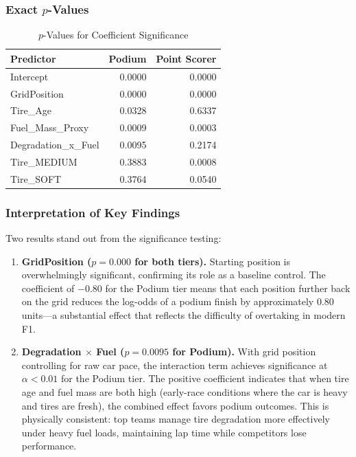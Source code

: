 \subsubsection{Exact $p$-Values}

\begin{table}[htbp]
  \centering
  \caption{$p$-Values for Coefficient Significance}
  \label{tab:pvalues}
  \small
  \begin{tabular}{lrr}
    \toprule
    \textbf{Predictor} & \textbf{Podium} & \textbf{Point Scorer} \\
    \midrule
    Intercept           & 0.0000 & 0.0000 \\
    GridPosition        & 0.0000 & 0.0000 \\
    Tire\_Age           & 0.0328 & 0.6337 \\
    Fuel\_Mass\_Proxy   & 0.0009 & 0.0003 \\
    Degradation\_x\_Fuel & 0.0095 & 0.2174 \\
    Tire\_MEDIUM        & 0.3883 & 0.0008 \\
    Tire\_SOFT          & 0.3764 & 0.0540 \\
    \bottomrule
  \end{tabular}
\end{table}

\subsubsection{Interpretation of Key Findings}

Two results stand out from the significance testing:

\begin{enumerate}
  \item \textbf{GridPosition ($p = 0.000$ for both tiers).} Starting position
    is overwhelmingly significant, confirming its role as a baseline control.
    The coefficient of $-0.80$ for the Podium tier means that each position
    further back on the grid reduces the log-odds of a podium finish by
    approximately 0.80 units---a substantial effect that reflects the
    difficulty of overtaking in modern F1.

  \item \textbf{Degradation $\times$ Fuel ($p = 0.0095$ for Podium).} With
    grid position controlling for raw car pace, the interaction term achieves
    significance at $\alpha < 0.01$ for the Podium tier. The positive
    coefficient indicates that when tire age and fuel mass are both high
    (early-race conditions where the car is heavy and tires are fresh), the
    combined effect favors podium outcomes. This is physically consistent:
    top teams manage tire degradation more effectively under heavy fuel loads,
    maintaining lap time while competitors lose performance.
\end{enumerate}

